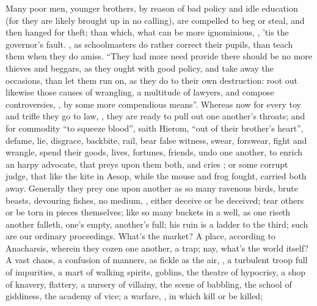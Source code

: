 Many poor men, younger brothers, \etc{} by reason of bad
policy and idle education (for they are likely brought up in no calling), are
compelled to beg or steal, and then hanged for theft; than which, what can be
more ignominious, , 'tis the governor's fault. , as schoolmasters do rather correct their pupils, than teach them when
they do amiss. \enquote{They had more need provide there should be
no more thieves and beggars, as they ought with good policy, and take away the
occasions, than let them run on, as they do to their own destruction: root out
likewise those causes of wrangling, a multitude of lawyers, and compose
controversies, , by some more compendious
means}. Whereas now for every toy and trifle they go to law,
, they are ready to pull out one another's throats; and
for commodity \enquote{to squeeze blood}, saith Hierom, \enquote{out of
their brother's heart}, defame, lie, disgrace, backbite, rail, bear false
witness, swear, forswear, fight and wrangle, spend their goods, lives,
fortunes, friends, undo one another, to enrich an harpy advocate, that preys
upon them both, and cries ; or some corrupt
judge, that like the kite in Aesop, while the mouse and
frog fought, carried both away. Generally they prey one upon another as so many
ravenous birds, brute beasts, devouring fishes, no medium,
, either deceive or be deceived; tear others
or be torn in pieces themselves; like so many buckets in a well, as one riseth
another falleth, one's empty, another's full; his ruin is a ladder to the
third; such are our ordinary proceedings. What's the market? A place, according
to Anacharsis, wherein they cozen one another, a trap; nay,
what's the world itself? A vast chaos, a confusion of
manners, as fickle as the air, , a turbulent troop
full of impurities, a mart of walking spirits, goblins, the theatre of
hypocrisy, a shop of knavery, flattery, a nursery of villainy, the scene of
babbling, the school of giddiness, the academy of vice; a warfare, , in which kill or be killed;
